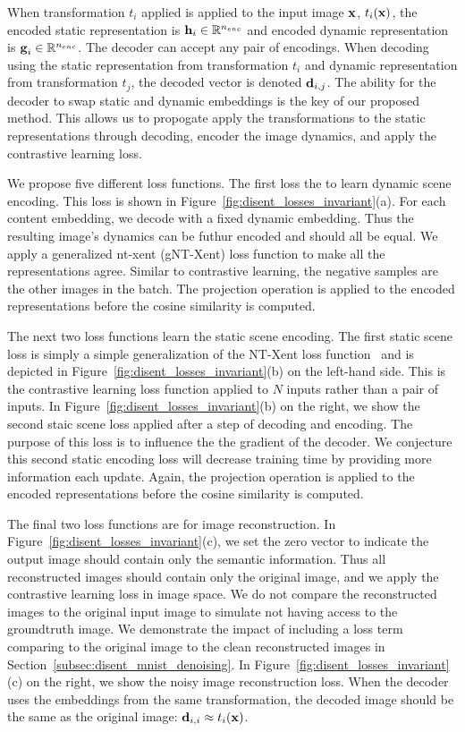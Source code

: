 \documentclass[11pt]{article}
\begin{document}
When transformation $t_i$ applied is applied to the input image $\boldsymbol{\mathrm{x}}$, $t_i(\boldsymbol{\mathrm{x}})$, the encoded static representation is $\boldsymbol{\mathrm{h}}_i \in \mathbb{R}^{n_{enc}} $ and encoded dynamic representation is $\boldsymbol{\mathrm{g}}_i \in \mathbb{R}^{n_{enc}}$. The decoder can accept any pair of encodings. When decoding using the static representation from transformation $t_i$ and dynamic representation from transformation $t_j$, the decoded vector is denoted $\boldsymbol{\mathrm{d}}_{i,j}$. The ability for the decoder to swap static and dynamic embeddings is the key of our proposed method. This allows us to propogate apply the transformations to the static representations through decoding, encoder the image dynamics, and apply the contrastive learning loss.


We propose five different loss functions. The first loss the to learn dynamic scene encoding. This loss is shown in Figure~\ref{fig:disent_losses_invariant}(a). For each content embedding, we decode with a fixed dynamic embedding. Thus the resulting image's dynamics can be futhur encoded and should all be equal. We apply a generalized nt-xent (gNT-Xent) loss function to make all the representations agree. Similar to contrastive learning, the negative samples are the other images in the batch. The projection operation is applied to the encoded representations before the cosine similarity is computed.

The next two loss functions learn the static scene encoding. The first static scene loss is simply a simple generalization of the NT-Xent loss function~\cite{chen2020simple} and is depicted in Figure~\ref{fig:disent_losses_invariant}(b) on the left-hand side. This is the contrastive learning loss function applied to $N$ inputs rather than a pair of inputs. In Figure~\ref{fig:disent_losses_invariant}(b) on the right, we show the second staic scene loss applied after a step of decoding and encoding. The purpose of this loss is to influence the the gradient of the decoder. We conjecture this second static encoding loss will decrease training time by providing more information each update. Again, the projection operation is applied to the encoded representations before the cosine similarity is computed.
 
The final two loss functions are for image reconstruction. In Figure~\ref{fig:disent_losses_invariant}(c), we set the zero vector to indicate the output image should contain only the semantic information. Thus all reconstructed images should contain only the original image, and we apply the contrastive learning loss in image space. We do not compare the reconstructed images to the original input image to simulate not having access to the groundtruth image. We demonstrate the impact of including a loss term comparing to the original image to the clean reconstructed images in Section~\ref{subsec:disent_mnist_denoising}. In Figure~\ref{fig:disent_losses_invariant}(c) on the right, we show the noisy image reconstruction loss. When the decoder uses the embeddings from the same transformation, the decoded image should be the same as the original image: $\boldsymbol{\mathrm{d}}_{i,i} \approx t_i(\boldsymbol{\mathrm{x}})$. 
\end{document}
